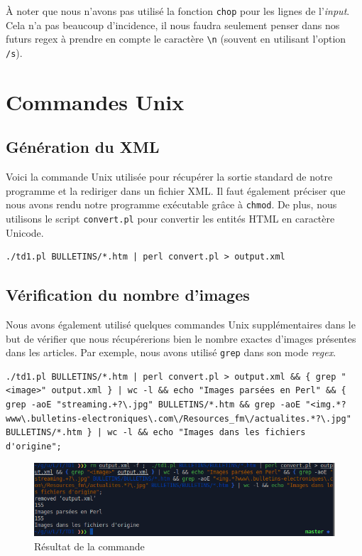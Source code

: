 À noter que nous n'avons pas utilisé la fonction \lstinline{chop} pour les lignes de l'\textit{input}. Cela n'a pas beaucoup d'incidence, il nous faudra seulement penser dans nos futurs regex à prendre en compte le caractère \lstinline{\n} (souvent en utilisant l'option \lstinline{/s}).

\section{Commandes Unix}

\subsection{Génération du XML}
\fakeshell

Voici la commande Unix utilisée pour récupérer la sortie standard de notre programme et la rediriger dans un fichier XML. Il faut également préciser que nous avons rendu notre programme exécutable grâce à \lstinline{chmod}. De plus, nous utilisons le script \lstinline{convert.pl} pour convertir les entités HTML en caractère Unicode.

\begin{lstlisting}
./td1.pl BULLETINS/*.htm | perl convert.pl > output.xml
\end{lstlisting}

\subsection{Vérification du nombre d'images}

Nous avons également utilisé quelques commandes Unix supplémentaires dans le but de vérifier que nous récupérerions bien le nombre exactes d'images présentes dans les articles. Par exemple, nous avons utilisé \lstinline{grep} dans son mode \textit{regex}.

\begin{lstlisting}
./td1.pl BULLETINS/*.htm | perl convert.pl > output.xml && { grep "<image>" output.xml } | wc -l && echo "Images parsées en Perl" && { grep -aoE "streaming.+?\.jpg" BULLETINS/*.htm && grep -aoE "<img.*?www\.bulletins-electroniques\.com\/Resources_fm\/actualites.*?\.jpg" BULLETINS/*.htm } | wc -l && echo "Images dans les fichiers d'origine";
\end{lstlisting}

\begin{figure}[H]
  \centering\includegraphics[width=1.00\textwidth]{images/output_td1.png}
  \caption{Résultat de la commande}
\end{figure}

